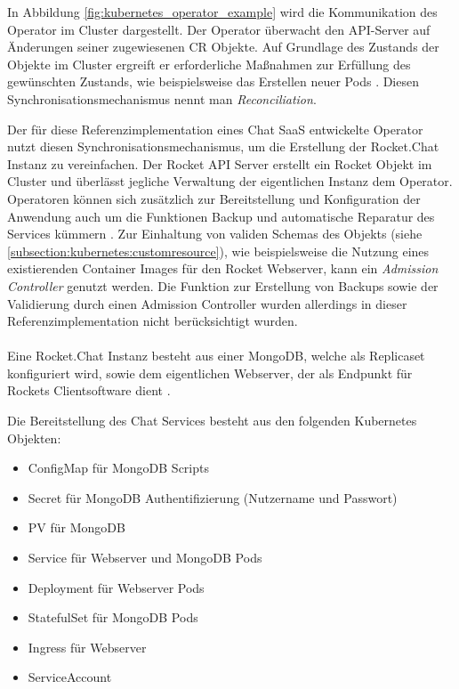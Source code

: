 In Abbildung \ref{fig:kubernetes_operator_example} wird die Kommunikation des Operator im Cluster dargestellt.
Der Operator überwacht den API-Server auf Änderungen seiner zugewiesenen \ac{CR} Objekte.
Auf Grundlage des Zustands der Objekte im Cluster ergreift er erforderliche Maßnahmen zur Erfüllung des gewünschten Zustands,
wie beispielsweise das Erstellen neuer Pods \cite{Dobies2020}.
Diesen Synchronisationsmechanismus nennt man \emph{Reconciliation}.

Der für diese Referenzimplementation eines Chat \ac{SaaS} entwickelte Operator nutzt diesen Synchronisationsmechanismus,
um die Erstellung der Rocket.Chat Instanz zu vereinfachen.
Der Rocket API Server erstellt ein Rocket Objekt im Cluster und überlässt jegliche Verwaltung der eigentlichen Instanz dem Operator.
Operatoren können sich zusätzlich zur Bereitstellung und Konfiguration der Anwendung auch um die Funktionen Backup
und automatische Reparatur des Services kümmern \cite{Dobies2020}.
Zur Einhaltung von validen Schemas des Objekts (siehe \ref{subsection:kubernetes:customresource}),
wie beispielsweise die Nutzung eines existierenden Container Images für den Rocket Webserver,
kann ein \emph{Admission Controller} genutzt werden.
Die Funktion zur Erstellung von Backups sowie der Validierung durch einen Admission Controller
wurden allerdings in dieser Referenzimplementation nicht berücksichtigt wurden.


\paragraph{}
Eine Rocket.Chat Instanz besteht aus einer MongoDB, welche als Replicaset konfiguriert wird,
sowie dem eigentlichen Webserver, der als Endpunkt für Rockets Clientsoftware dient \cite{rocketChatDocs}.

Die Bereitstellung des Chat Services besteht aus den folgenden Kubernetes Objekten:
\begin{itemize}
  \item ConfigMap für MongoDB Scripts
  \item Secret für MongoDB Authentifizierung (Nutzername und Passwort)
  \item \ac{PV} für MongoDB
  \item Service für Webserver und MongoDB Pods
  \item Deployment für Webserver Pods
  \item StatefulSet für MongoDB Pods
  \item Ingress für Webserver
  \item ServiceAccount
\end{itemize}

